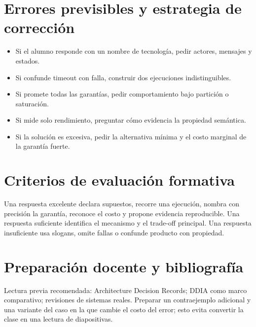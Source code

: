 \documentclass[variant=docente,cover=institutional,mode=screen]{ua-engineering-v6-article}
\begin{document}
\section{Errores previsibles y estrategia de corrección}
\begin{itemize}
\item Si el alumno responde con un nombre de tecnología, pedir actores, mensajes y estados.
\item Si confunde timeout con falla, construir dos ejecuciones indistinguibles.
\item Si promete todas las garantías, pedir comportamiento bajo partición o saturación.
\item Si mide solo rendimiento, preguntar cómo evidencia la propiedad semántica.
\item Si la solución es excesiva, pedir la alternativa mínima y el costo marginal de la garantía fuerte.
\end{itemize}

\section{Criterios de evaluación formativa}
Una respuesta excelente declara supuestos, recorre una ejecución, nombra con precisión la garantía, reconoce el costo y propone evidencia reproducible. Una respuesta suficiente identifica el mecanismo y el trade-off principal. Una respuesta insuficiente usa slogans, omite fallas o confunde producto con propiedad.

\section{Preparación docente y bibliografía}
Lectura previa recomendada: Architecture Decision Records; DDIA como marco comparativo; revisiones de sistemas reales. Preparar un contraejemplo adicional y una variante del caso en la que cambie el costo del error; esto evita convertir la clase en una lectura de diapositivas.
\end{document}

